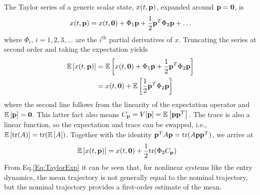 The Taylor series of a generic scalar state, $x(t,\mathbf{p})$, expanded around $\mathbf{p}=\mathbf{0}$, is 
\begin{align}
	x(t,\mathbf{p}) = x(t,\mathbf{0}) + \Phi_1\mathbf{p} + \frac{1}{2}\mathbf{p}^T\Phi_2\mathbf{p} + \dots
\end{align} 
where $\Phi_i,\,i=1,2,3,\dots$ are the $i^{\mathrm{th}}$ partial derivatives of $x$. 
Truncating the series at second order and taking the expectation yields
\begin{align}
	\mathbb{E}\left[x(t,\mathbf{p})\right] &= \mathbb{E}\left[x(t,\mathbf{0}) + \Phi_1\mathbf{p} + \frac{1}{2}\mathbf{p}^T\Phi_2\mathbf{p}\right] \\
	 &= x(t,\mathbf{0}) + \mathbb{E}\left[\frac{1}{2}\mathbf{p}^T\Phi_2\mathbf{p}\right]
\end{align}
where the second line follows from the linearity of the expectation operator and $\mathbb{E}\left[\mathbf{p}\right] = \mathbf{0}$. This latter fact also means $C_{\mathbf{p}} = V[\mathbf{p}] = \mathbb{E}\left[\mathbf{p}\mathbf{p}^T\right]$. 
The trace is also a linear function, so the expectation and trace can be swapped, i.e., $\mathbb{E}\left[\mathrm{tr}(A)\right] = \mathrm{tr}(\mathbb{E}\left[A\right])$. Together with the identity $\mathbf{p}^TA\mathbf{p} = \mathrm{tr}(A\mathbf{p}\mathbf{p}^T)$, we arrive at
\begin{align}
	 	\mathbb{E}\left[x(t,\mathbf{p})\right] &= x(t,\mathbf{0}) + \frac{1}{2}\mathrm{tr}(\Phi_2C_{\mathbf{p}}) \label{Eq:TaylorExp}
\end{align}
From Eq.\eqref{Eq:TaylorExp} it can be seen that, for nonlinear systems like the entry dynamics, the mean trajectory is not generally equal to the nominal trajectory, but the nominal trajectory provides a first-order estimate of the mean. 



